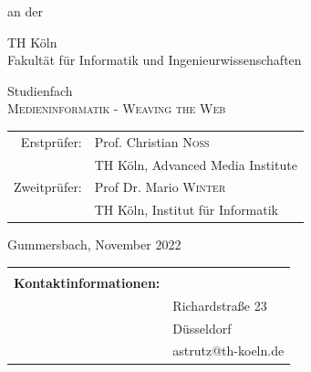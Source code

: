 \begin{titlepage}
\begin{center}
\vspace{0.6cm}

\begin{large}
an der\\ 
\vspace{0.2cm}
\begin{scshape}
TH Köln\\
Fakultät für Informatik und Ingenieurwissenschaften\\
\end{scshape}
\end{large}

\vspace{0.8cm}

\begin{large}
Studienfach\\ 
\vspace{0.2cm}
\textsc{Medieninformatik - Weaving the Web}
\end{large}


\vspace{1.0cm}

\begin{tabular}{rl}
        Erstprüfer:  &  Prof. Christian \textsc{Noss}\\
       					&  \small TH Köln, Advanced Media Institute \\[1.0em]
       Zweitprüfer:  &  Prof Dr. Mario \textsc{Winter} \\
       					&  \small TH Köln, Institut für Informatik\\[1.0em]
\end{tabular}

\vspace{0.6cm}

\begin{large}
Gummersbach, November 2022
\end{large}

\end{center}

\newpage
\thispagestyle{empty}

\begin{center}
\begin{tabular}{rl}
							&  \\[36.0em]
							
\large \textbf{Kontaktinformationen:}	&  	\quad \authorname \\
							&  	\quad Richardstraße 23\\
							&	\quad 40231 Düsseldorf\\
							&  	\quad astrutz@th-koeln.de\\[2.0em]
							

\end{tabular}
\end{center}
\end{titlepage}
